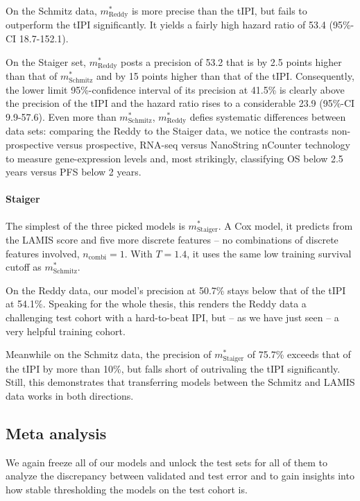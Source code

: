 On the Schmitz data, $m^*_\text{Reddy}$ is more precise than the tIPI, but fails to outperform the 
tIPI significantly. It yields a fairly high hazard ratio of \num{53.4} 
(\num{95}\%-CI \num{18.7}-\num{152.1}).

On the Staiger set, $m^*_\text{Reddy}$ posts a precision of \num{53.2} that is by \num{2.5} 
points higher than that of $m^*_\text{Schmitz}$ and by \num{15} points higher than that of the tIPI. 
Consequently, the lower limit \num{95}\%-confidence interval of its precision at \num{41.5}\% is 
clearly above the precision of the tIPI and the hazard ratio rises to a considerable \num{23.9}
(\num{95}\%-CI \num{9.9}-\num{57.6}). Even more than $m^*_\text{Schmitz}$, $m^*_\text{Reddy}$ 
defies systematic differences between data sets: comparing the Reddy to the Staiger data, we 
notice the contrasts non-prospective versus prospective, 
RNA-seq versus NanoString nCounter technology to measure gene-expression levels and, most strikingly, 
classifying OS below \num{2.5} years versus PFS below \num{2} years.

\paragraph{Staiger}
The simplest of the three picked models is $m^*_\text{Staiger}$. A Cox model, it predicts from 
the LAMIS score and five more discrete features -- no combinations of discrete features involved, 
$n_\text{combi} = 1$. With $T = \num{1.4}$, it uses the same low training survival cutoff as 
$m^*_\text{Schmitz}$.

On the Reddy data, our model's precision at \num{50.7}\% stays below that of the tIPI at \num{54.1}\%. 
Speaking for the whole thesis, this renders the Reddy data a challenging test cohort with a 
hard-to-beat IPI, but -- as we have just seen -- a very helpful training cohort.

Meanwhile on the Schmitz data, the precision of $m^*_\text{Staiger}$ of \num{75.7}\% exceeds that 
of the tIPI by more than \num{10}\%, but falls short of outrivaling the tIPI significantly. Still, 
this demonstrates that transferring models between the Schmitz and LAMIS data works in both 
directions.

\subsection{Meta analysis}

We again freeze all of our models and unlock the test sets for all of them to analyze the discrepancy 
between validated and test error and to gain insights into how stable thresholding the models on the 
test cohort is.

